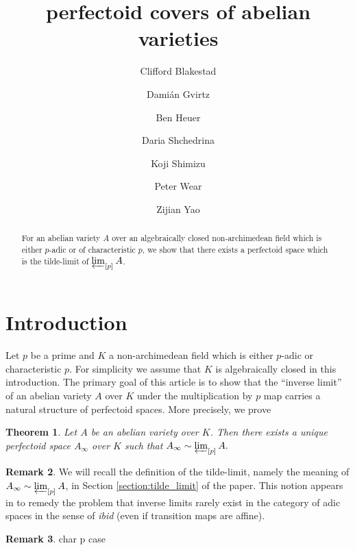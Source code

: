 \documentclass[10pt,oneside]{amsart}
\title[perfectoid covers of abelian varieties]{perfectoid  covers of abelian varieties}
\author{
	Clifford Blakestad \and
	Dami\'an Gvirtz \and
	Ben Heuer \and 
	Daria Shchedrina \and
	Koji Shimizu \and 
	Peter Wear \and
	Zijian Yao}
\newtheorem{mainthm}{Theorem}
\theoremstyle{definition}
\newtheorem{remark*}[mainthm]{Remark}
\begin{document}
	
	\maketitle
	
	\begin{abstract}
For an abelian variety $A$ over an algebraically closed non-archimedean field which is either $p$-adic or of characteristic $p$, we show that there exists a perfectoid space which is the tilde-limit of $\varprojlim_{[p]}A$.
	\end{abstract}
	

	
	\section{Introduction} 

Let $p$ be a prime and $K$ a non-archimedean field which is either $p$-adic or characteristic $p$. For simplicity we assume that $K$ is  algebraically closed in this introduction. The primary goal of this article is to show that the ``inverse limit'' of an abelian variety $A$ over $K$ under the multiplication by $p$ map carries a natural structure of perfectoid spaces. %
More precisely, we prove 

         \begin{mainthm} \label{thm:main_thm_intro}
		Let $A$ be an abelian variety over $K$. Then there exists a unique perfectoid space $A_\infty$ over $K$ such that
				$A_\infty \sim \varprojlim_{[p]} A.$
	\end{mainthm}
	
\begin{remark*}	 \label{remark:inverse_limit_adic}
We will recall the definition of the tilde-limit, namely the meaning of $A_\infty \sim \varprojlim_{[p]} A$, in Section \ref{section:tilde_limit} of the paper. This notion appears in \cite{SW} to remedy the problem that inverse limits rarely exist in the category of adic spaces in the sense of \textit{\small ibid} (even if transition maps are affine). 
\end{remark*}

\begin{remark*}	 
{\color{red}  char p case }
\end{remark*}
\end{document}
